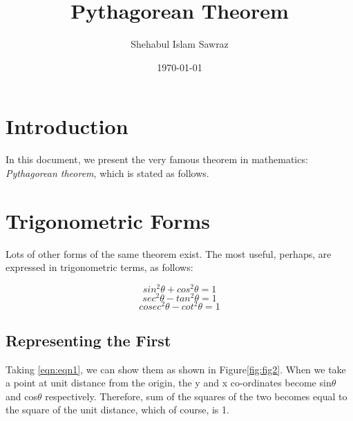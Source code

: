 \documentclass{article}
\title{Pythagorean Theorem}
\author{Shehabul Islam Sawraz}
\date{\today}
\begin{document}
\maketitle
\section{Introduction}
In this document, we present the very famous theorem in mathematics:  \textit{Pythagorean
theorem}, which is stated as follows.



\newpage



\section{Trigonometric Forms}
Lots of other forms of the same theorem exist. The most useful, perhaps, are
expressed in trigonometric terms, as follows:

\begin{equation}
    sin^2\theta + cos^2\theta = 1
\label{eqn:eqn1}
\end{equation}
\begin{equation}
    sec^2\theta - tan^2\theta = 1
\label{eqn:eqn2}
\end{equation}
\begin{equation}
    cosec^2\theta - cot^2\theta = 1
\label{eqn:eqn3}
\end{equation}

\subsection{Representing the First}
Taking \ref{eqn:eqn1}, we can show them as shown in Figure\ref{fig:fig2}. When we take a point at
unit distance from the origin, the y and x co-ordinates become sin$\theta$ and cos$\theta$
respectively. Therefore, sum of the squares of the two becomes equal to the
square of the unit distance, which of course, is 1.
\end{document}
